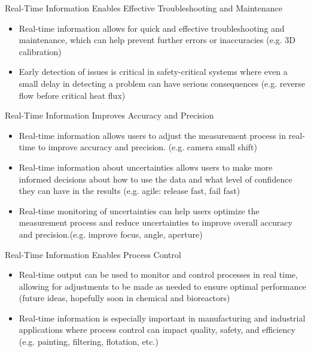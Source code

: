



\begin{frame}[label=why-6]{Real-Time Information Enables Effective Troubleshooting and Maintenance}

\begin{itemize}
\item Real-time information allows for quick and effective troubleshooting and maintenance, which can help prevent further errors or inaccuracies (e.g. 3D calibration)
\item Early detection of issues is critical in safety-critical systems where even a small delay in detecting a problem can have serious consequences (e.g. reverse flow before critical heat flux)
\end{itemize}

\end{frame}

\begin{frame}[label=why-7]{Real-Time Information Improves Accuracy and Precision}

\begin{itemize}
\item Real-time information allows users to adjust the measurement process in real-time to improve accuracy and precision. (e.g. camera small shift)
\item Real-time information about uncertainties allows users to make more informed decisions about how to use the data and what level of confidence they can have in the results (e.g. agile: release fast, fail fast) 
\item Real-time monitoring of uncertainties can help users optimize the measurement process and reduce uncertainties to improve overall accuracy and precision.(e.g. improve focus, angle, aperture)
\end{itemize}
\end{frame}


\begin{frame}[label=why-9]{Real-Time Information Enables Process Control}

\begin{itemize}
\item Real-time output can be used to monitor and control processes in real time, allowing for adjustments to be made as needed to ensure optimal performance (future ideas, hopefully soon in chemical and bioreactors)
\item Real-time information is especially important in manufacturing and industrial applications where process control can impact quality, safety, and efficiency (e.g. painting, filtering, flotation, etc.)
\end{itemize}
\end{frame}


